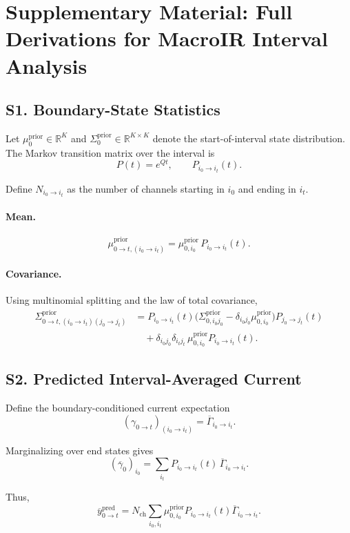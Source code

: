 \documentclass[11pt]{article}
\begin{document}
\section*{Supplementary Material: Full Derivations for MacroIR Interval Analysis}

\subsection*{S1. Boundary-State Statistics}

Let $\mu^{\text{prior}}_0 \in \mathbb{R}^K$ and 
$\Sigma^{\text{prior}}_0 \in \mathbb{R}^{K\times K}$ denote the
start-of-interval state distribution. The Markov transition matrix over the
interval is
\[
P(t) = e^{Qt},\qquad P_{i_0\to i_t}(t).
\]

Define $N_{i_0\to i_t}$ as the number of channels starting in $i_0$ and ending in $i_t$.

\paragraph{Mean.}
\[
\mu^{\text{prior}}_{0\to t,(i_0\to i_t)}
= \mu^{\text{prior}}_{0,i_0}\,P_{i_0\to i_t}(t).
\]

\paragraph{Covariance.}
Using multinomial splitting and the law of total covariance,
\begin{align}
\Sigma^{\text{prior}}_{0\to t,(i_0\to i_t)(j_0\to j_t)}
&=
P_{i_0\to i_t}(t)\bigl(\Sigma^{\text{prior}}_{0,i_0 j_0} - \delta_{i_0j_0}\mu^{\text{prior}}_{0,i_0}\bigr)
P_{j_0\to j_t}(t)
\nonumber\\
&\quad+
\delta_{i_0j_0}\delta_{i_t j_t}\,\mu^{\text{prior}}_{0,i_0}P_{i_0\to i_t}(t).
\end{align}

\subsection*{S2. Predicted Interval-Averaged Current}

Define the boundary-conditioned current expectation
\[
(\gamma_{0\to t})_{(i_0\to i_t)} = \overline{\Gamma}_{i_0\to i_t}.
\]

Marginalizing over end states gives
\[
(\overline{\gamma}_0)_{i_0}
= \sum_{i_t} P_{i_0\to i_t}(t)\,\overline{\Gamma}_{i_0\to i_t}.
\]

Thus,
\[
\overline{y}^{\mathrm{pred}}_{0\to t}
= N_{\mathrm{ch}}\sum_{i_0,i_t}
\mu^{\text{prior}}_{0,i_0}P_{i_0\to i_t}(t)\overline{\Gamma}_{i_0\to i_t}.
\]
\end{document}
